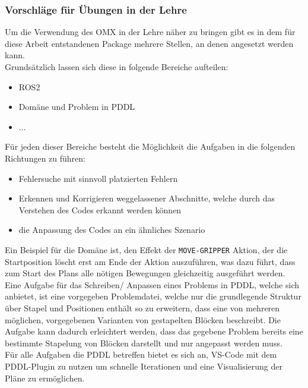 \subsubsection{Vorschläge für Übungen in der Lehre}
Um die Verwendung des OMX in der Lehre näher zu bringen gibt es in dem für diese Arbeit entstandenen Package mehrere Stellen, an denen angesetzt werden kann.\\
Grundsätzlich lassen sich diese in folgende Bereiche aufteilen:
\begin{itemize}
\item \ac{ROS2}
\item Domäne und Problem in PDDL
\item ...
\end{itemize}
Für jeden dieser Bereiche besteht die Möglichkeit die Aufgaben in die folgenden Richtungen zu führen:
\begin{itemize}
\item Fehlersuche mit sinnvoll platzierten Fehlern
\item Erkennen und Korrigieren weggelassener Abschnitte, welche durch das Verstehen des Codes erkannt werden können
\item die Anpassung des Codes an ein ähnliches Szenario
\end{itemize}
Ein Beispiel für die Domäne ist, den Effekt der \verb|MOVE-GRIPPER| Aktion, der die Startposition löscht erst am Ende der Aktion auszuführen, was dazu führt, dass zum Start des Plans alle nötigen Bewegungen gleichzeitig ausgeführt werden.\\
Eine Aufgabe für das Schreiben/ Anpassen eines Problems in PDDL, welche sich anbietet, ist eine vorgegeben Problemdatei, welche nur die grundlegende Struktur über Stapel und Positionen enthält so zu erweitern, dass eine von mehreren möglichen, vorgegebenen Varianten von gestapelten Blöcken beschreibt.
Die Aufgabe kann dadurch erleichtert werden, dass das gegebene Problem bereits eine bestimmte Stapelung von Blöcken darstellt und nur angepasst werden muss.\\
Für alle Aufgaben die PDDL betreffen bietet es sich an, VS-Code mit dem PDDL-Plugin zu nutzen um schnelle Iterationen und eine Visualisierung der Pläne zu ermöglichen.